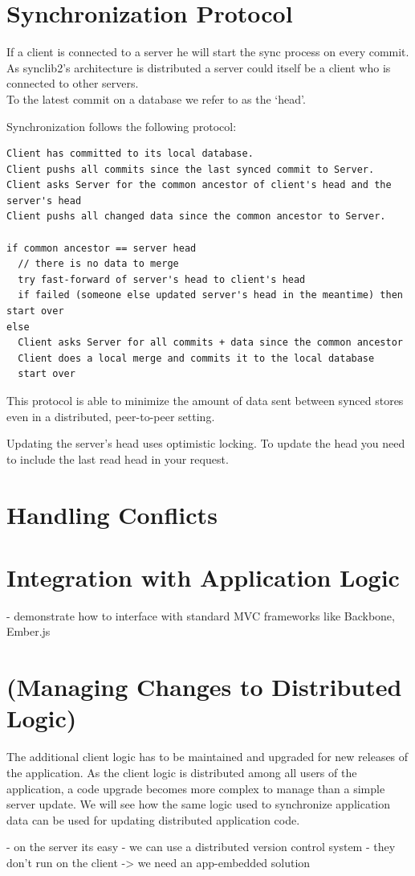 \section{Synchronization Protocol}
If a client is connected to a server he will start the sync process on every commit. As
synclib2's architecture is distributed a server could itself be a client
who is connected to other servers.\\To the latest commit on a database
we refer to as the `head'.

Synchronization follows the following protocol:

\begin{verbatim}
Client has committed to its local database.
Client pushs all commits since the last synced commit to Server.
Client asks Server for the common ancestor of client's head and the server's head
Client pushs all changed data since the common ancestor to Server.

if common ancestor == server head
  // there is no data to merge
  try fast-forward of server's head to client's head
  if failed (someone else updated server's head in the meantime) then start over
else
  Client asks Server for all commits + data since the common ancestor
  Client does a local merge and commits it to the local database
  start over
\end{verbatim}

This protocol is able to minimize the amount of data sent between synced
stores even in a distributed, peer-to-peer setting.

Updating the server's head uses optimistic locking. To update the head
you need to include the last read head in your request.

\section{Handling Conflicts}

\section{Integration with Application Logic}
- demonstrate how to interface with standard MVC frameworks like Backbone, Ember.js

\section{(Managing Changes to Distributed Logic)}
The additional client logic has to be maintained and upgraded for new releases of the application. As the client logic is distributed among all users of the application, a code upgrade becomes more complex to manage than a simple server update. We will see how the same logic used to synchronize application data can be used for updating distributed application code.

- on the server its easy - we can use a distributed version control system
- they don't run on the client -> we need an app-embedded solution

